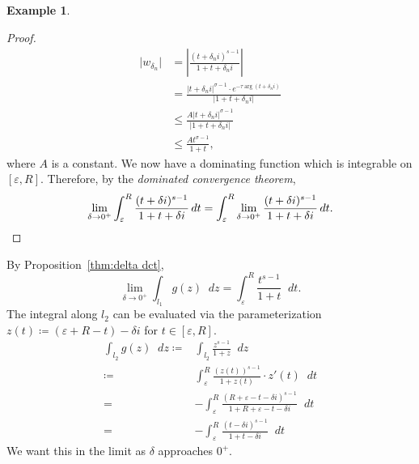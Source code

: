 \documentclass[a4paper]{article}
\newcommand*\diff{\mathop{}\!d} %
\theoremstyle{definition}
\newtheorem{example}[theorem]{Example}
\begin{document}
\begin{example}
\begin{proof}
        \begin{align*}
            \lvert w_{\delta_n} \rvert & = \left\lvert \frac{(t+\delta_n i)^{s-1}}{1+t+\delta_n i} \right\rvert                                              \\
                                       & = \frac{\lvert t + \delta_n i \rvert^{\sigma-1} \cdot e^{- \tau \arg (t+\delta_n i)}}{\lvert 1+t+\delta_n i \rvert} \\
                                       & \leq \frac{A\lvert t + \delta_n i \rvert^{\sigma-1}}{\lvert 1+t+\delta_n i \rvert}                                  \\
                                       & \leq \frac{At^{\sigma-1}}{1+t},
        \end{align*}
        where $A$ is a constant.
        We now have a dominating function which is integrable on $[\varepsilon,R]$.
        Therefore, by the \emph{dominated convergence theorem},
        \begin{equation*}
            \lim_{\delta \to 0^+} \int_\varepsilon^R \frac{(t+\delta i)^{s-1}}{1+t+\delta i} \diff t = \int_\varepsilon^R \lim_{\delta \to 0^+} \frac{(t+\delta i)^{s-1}}{1+t+\delta i} \diff t. \qedhere
        \end{equation*}
    \end{proof}
    By Proposition~\ref{thm:delta dct},
    \begin{equation*}
        \lim_{\delta \to 0^+} \int_{l_1} g(z) \diff z = \int_\varepsilon^R \frac{t^{s-1}}{1+t} \diff t.
    \end{equation*}
    The integral along $l_2$ can be evaluated via the parameterization $z(t) \coloneq (\varepsilon+R-t) - \delta i$ for $t \in [\varepsilon, R]$.
    \begin{align*}
        \int_{l_2} g(z) \diff z \coloneq & \int_{l_2} \frac{z^{s-1}}{1+z} \diff z                                                           \\
        \coloneq                         & \int_\varepsilon^R \frac{(z(t))^{s-1}}{1+z(t)} \cdot z'(t) \diff t                               \\
        =                                & - \int_\varepsilon^R \frac{(R+\varepsilon-t-\delta i)^{s-1}}{1+R+\varepsilon-t-\delta i} \diff t \\
        =                                & - \int_\varepsilon^R \frac{(t-\delta i)^{s-1}}{1+t-\delta i} \diff t
    \end{align*}
    We want this in the limit as $\delta$ approaches $0^+$.

\end{example}
\end{document}

